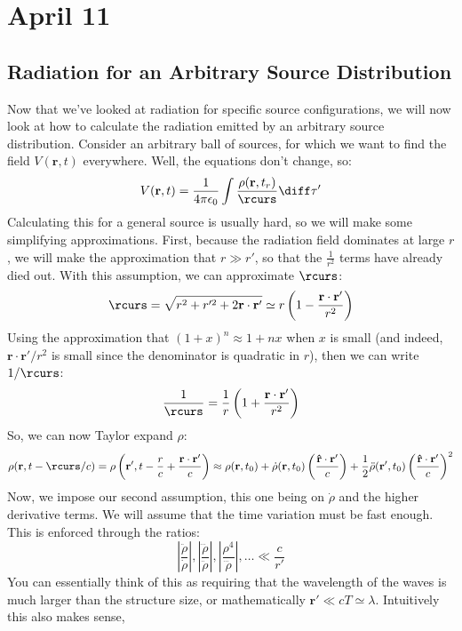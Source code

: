 \section{April 11}
\subsection{Radiation for an Arbitrary Source Distribution}
Now that we've looked at radiation for specific source configurations, we will now look at how to calculate
the radiation emitted by an arbitrary source distribution. Consider an arbitrary ball of sources, for which
we want to find the field \( V(\mathbf{r}, t) \) everywhere. Well, the equations don't change, so:
\[
	V(\mathbf{r}, t) = \frac{1}{4\pi \epsilon_0} \int \frac{\rho(\mathbf{r}, t_r)}{\rcurs} \diff \tau'
\]
Calculating this for a general source is usually hard, so we will make some simplifying approximations.
First, because the radiation field dominates at large \( r \), we will make the approximation that \( r \gg
r' \), so that the \( \frac{1}{r^2} \) terms have already died out. With this assumption, we can approximate
\( \rcurs \):
\[
	\rcurs = \sqrt{r^2 + r'^2 + 2 \mathbf{r} \cdot \mathbf{r}'} \simeq r \left( 1 - \frac{\mathbf{r} \cdot
	\mathbf{r}'}{r^2} \right)
\]
Using the approximation that \( (1 + x)^{n} \approx 1 + nx \) when \( x \) is small (and indeed, \(
\mathbf{r}\cdot \mathbf{r}' / r^2 \) is small since the denominator is quadratic in \( r \)), then we can
write \( 1 / \rcurs \):
\[
	\frac{1}{\rcurs} = \frac{1}{r}\left( 1 + \frac{\mathbf{r} \cdot \mathbf{r}'}{r^2} \right)
\]
So, we can now Taylor expand \( \rho \):
\[
	\rho(\mathbf{r}, t - \rcurs / c) = \rho\left( \mathbf{r}', t - \frac{r}{c} + \frac{\mathbf{r} \cdot
	\mathbf{r}'}{c} \right) \approx \rho(\mathbf{r}, t_0) + \dot \rho(\mathbf{r}, t_0) \left(
	\frac{\mathbf{\hat{r}} \cdot \mathbf{r}'}{c} \right) + \frac{1}{2} \ddot \rho (\mathbf{r}', t_0) \left(
	\frac{\mathbf{\hat{r}} \cdot \mathbf{r}'}{c} \right)^2
\]
Now, we impose our second assumption, this one being on \( \dot \rho \) and the higher derivative terms. We
will assume that the time variation must be fast enough. This is enforced through the ratios:
\[
	\left| \frac{\ddot \rho}{\dot \rho} \right|, \left| \frac{\dddot \rho}{\ddot \rho} \right|, \left|
	\frac{\rho^{4}}{\dddot \rho} \right|, \dots \ll \frac{c}{r'}
\]
You can essentially think of this as requiring that the wavelength of the waves is much larger than the
structure size, or mathematically \( \mathbf{r}' \ll cT \simeq \lambda \). Intuitively this also makes sense,
